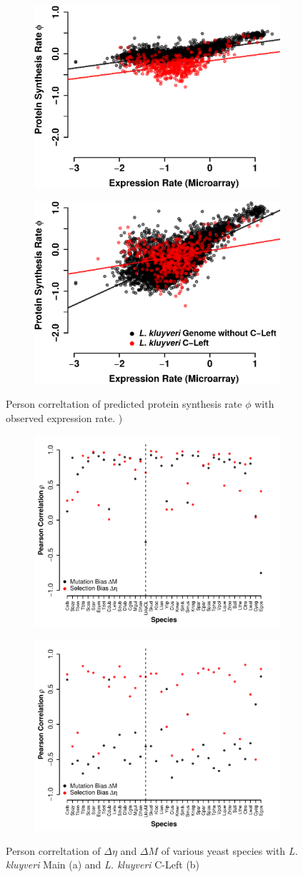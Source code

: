\documentclass[12pt,draft]{article}
\begin{document}
\begin{figure}[H]
    \centering
    \begin{subfigure}
        \centering
        \includegraphics[width=.4\textwidth]{img/phi_corr_plot_whole_Genome_estim.eps}
    \end{subfigure}
    \begin{subfigure}
        \centering
        \includegraphics[width=.4\textwidth]{img/phi_corr_plot_split_Genome_estim.eps}
    \end{subfigure}
    \caption{Person correltation of predicted protein synthesis rate $\phi$ with observed expression rate. )}
    \label{fig:phi_corr_two_cond}
\end{figure}

	
\begin{figure}[H]
    \centering
    \begin{subfigure}
        \centering
        \includegraphics[width=.4\textwidth]{img/csp_all_species_vs_kuyveri_main}
    \end{subfigure}
    \begin{subfigure}
        \centering
        \includegraphics[width=.4\textwidth]{img/csp_all_species_vs_kuyveri_cleft}
    \end{subfigure}
    \caption{Person correltation of $\Delta \eta$ and $\Delta M$ of various yeast species with \textit{L. kluyveri} Main (a) and \textit{L. kluyveri} C-Left (b)}
    \label{fig:csp_cor_all_yeast}
\end{figure}
\end{document}
